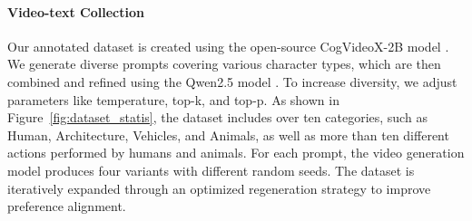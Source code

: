 \paragraph{Video-text Collection} 
Our annotated dataset is created using the open-source CogVideoX-2B model \cite{yang2024cogvideox}. We generate diverse prompts covering various character types, which are then combined and refined using the Qwen2.5 model \cite{qwen2.5}. To increase diversity, we adjust parameters like temperature, top-k, and top-p. As shown in Figure~\ref{fig:dataset_statis}, the dataset includes over ten categories, such as Human, Architecture, Vehicles, and Animals, as well as more than ten different actions performed by humans and animals. For each prompt, the video generation model produces four variants with different random seeds. The dataset is iteratively expanded through an optimized regeneration strategy to improve preference alignment.




